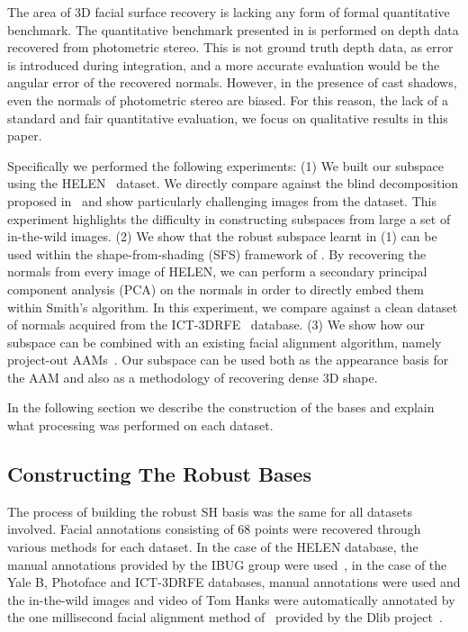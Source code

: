 The area of 3D facial surface recovery is lacking any form of formal
quantitative benchmark. The quantitative benchmark presented in
\cite{KemelmacherShlizerman:2013iv} is performed on depth data recovered from photometric
stereo. This is not ground truth depth data, as error is introduced during
integration, and a more accurate evaluation would be the angular error of the
recovered normals. However, in the presence of cast shadows, even the normals of
photometric stereo are biased. For this reason, the lack of a standard and fair
quantitative evaluation, we focus on qualitative results in this paper.

Specifically we performed the following experiments: (1) We built our subspace
using the HELEN~\cite{le2012interactive} dataset. We directly compare against the
blind decomposition proposed in~\cite{KemelmacherShlizerman:2013iv} and show particularly
challenging images from the dataset. This experiment highlights the difficulty
in constructing subspaces from large a set of in-the-wild images. (2) We show
that the robust subspace learnt in (1) can be used within the shape-from-shading
(SFS) framework of \citet{smith2006recovering}. By recovering the normals
from every image of HELEN, we can perform a secondary principal component
analysis (PCA) on the normals in order to directly embed them within Smith's
algorithm. In this experiment, we compare against a clean dataset of normals
acquired from the ICT-3DRFE~\cite{stratou2012exploring} database. (3) We show how our
subspace can be combined with an existing facial alignment algorithm, namely
project-out AAMs~\cite{matthews2004active}. Our subspace can be used both as the
appearance basis for the AAM and also as a methodology of recovering dense 3D
shape.

In the following section we describe the construction of the bases and explain
what processing was performed on each dataset.
\subsection{Constructing The Robust Bases}\label{subsec:construction}
The process of building the robust SH basis was the same for all datasets
involved. Facial annotations consisting of 68 points were recovered through
various methods for each dataset. In the case of the HELEN database, the manual
annotations provided by the IBUG group were used~\cite{sagonas2013300,sagonas2013semi},
in the case of the Yale B, Photoface and ICT-3DRFE databases, manual annotations
were used and the in-the-wild images and video of Tom Hanks were automatically
annotated by the one millisecond facial alignment method of~\cite{kazemi2014one}
provided by the Dlib project~\cite{king2009dlib}.

